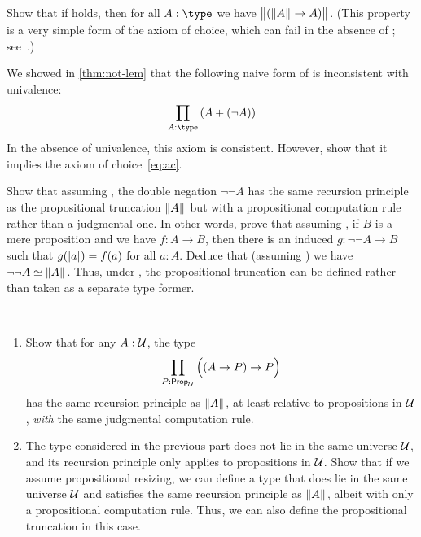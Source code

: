 \begin{ex}\label{ex:lem-impl-simple-ac}
  Show that if \LEM{} holds, then for all $A:\type$ we have $\bigl\Vert (\mathopen{}\left\Vert A\right\Vert_{}\mathclose{} \to A)\bigr\Vert_{}$.
  (This property is a very simple form of the axiom of choice, which can fail in the absence of \LEM{}; see~\cite{krausgeneralizations}.)
\end{ex}

\begin{ex}\label{ex:naive-lem-impl-ac}
  We showed in \cref{thm:not-lem} that the following naive form of \LEM{} is inconsistent with univalence:
  \[ \prd{A:\type} (A+(\neg A)) \]
  In the absence of univalence, this axiom is consistent.
  However, show that it implies the axiom of choice~\eqref{eq:ac}.
\end{ex}

\begin{ex}\label{ex:lem-brck}
  Show that assuming \LEM{}, the double negation $\neg \neg A$ has the same recursion principle as the propositional truncation $\mathopen{}\left\Vert A\right\Vert_{}\mathclose{}$ but with a propositional computation rule rather than a judgmental one.
  In other words, prove that assuming \LEM{}, if $B$ is a mere proposition and we have $f:A\to B$, then there is an induced $g:\neg\neg A \to B$ such that $g(\mathopen{}\left|a\right|_{}^{}\mathclose{}) = f(a)$ for all $a:A$.
  Deduce that (assuming \LEM{}) we have $\neg\neg A \simeq \mathopen{}\left\Vert A\right\Vert_{}\mathclose{}$.
  Thus, under \LEM{}, the propositional truncation can be defined rather than taken as a separate type former.
\end{ex}

\begin{ex}\label{ex:impred-brck}\ 
  \begin{enumerate}
  \item Show that for any $A : \mathcal{U}$, the type
    \[\prd{P:\prop_{\UU}} \Parens{(A\to P)\to P}\]
    has the same recursion principle as $\mathopen{}\left\Vert A\right\Vert_{}\mathclose{}$, at least relative to propositions in $\mathcal{U}$, \emph{with} the same judgmental computation rule.
  \item The type considered in the previous part does not lie in the same universe $\mathcal{U}$, and its recursion principle only applies to propositions in $\mathcal{U}$.
    Show that if we assume propositional resizing, we can define a type that does lie in the same universe $\mathcal{U}$ and satisfies the same recursion principle as $\mathopen{}\left\Vert A\right\Vert_{}\mathclose{}$, albeit with only a propositional computation rule.
    Thus, we can also define the propositional truncation in this case.
  \end{enumerate}
\end{ex}

